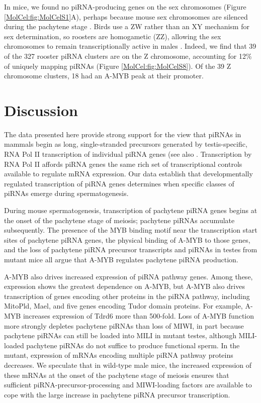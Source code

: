     In mice, we found no piRNA-producing genes on the sex chromosomes (Figure \ref{MolCel:fig:MolCelS1}A), perhaps because mouse sex chromosomes are silenced during the pachytene stage \citep{Li2009d}. Birds use a ZW rather than an XY mechanism for sex determination, so roosters are homogametic (ZZ), allowing the sex chromosomes to remain transcriptionally active in males \citep{Namekawa2009, Schoenmakers2009}. Indeed, we find that 39 of the 327 rooster piRNA clusters are on the Z chromosome, accounting for 12\% of uniquely mapping piRNAs (Figure \ref{MolCel:fig:MolCelS8}). Of the 39 Z chromosome clusters, 18 had an A-MYB peak at their promoter.

\section{Discussion}
  \label{MolCel:sec:Discussion}

  The data presented here provide strong support for the view that piRNAs in mammals begin as long, single-stranded precursors generated by testis-specific, RNA Pol II transcription of individual piRNA genes (see also \citet{Vourekas2012}. Transcription by RNA Pol II affords piRNA genes the same rich set of transcriptional controls available to regulate mRNA expression. Our data establish that developmentally regulated transcription of piRNA genes determines when specific classes of piRNAs emerge during spermatogenesis.

  During mouse spermatogenesis, transcription of pachytene piRNA genes begins at the onset of the pachytene stage of meiosis; pachytene piRNAs accumulate subsequently. The presence of the MYB binding motif near the transcription start sites of pachytene piRNA genes, the physical binding of A-MYB to those genes, and the loss of pachytene piRNA precursor transcripts and piRNAs in testes from \amyb{} mutant mice all argue that A-MYB regulates pachytene piRNA production.

  A-MYB also drives increased expression of piRNA pathway genes. Among these, \miwi{} expression shows the greatest dependence on A-MYB, but A-MYB also drives transcription of genes encoding other proteins in the piRNA pathway, including MitoPld, Mael, and five genes encoding Tudor domain proteins. For example, A-MYB increases expression of Tdrd6 more than 500-fold. Loss of A-MYB function more strongly depletes pachytene piRNAs than loss of MIWI, in part because pachytene piRNAs can still be loaded into MILI in \miwi{} mutant testes, although MILI-loaded pachytene piRNAs do not suffice to produce functional sperm. In the \amyb{} mutant, expression of mRNAs encoding multiple piRNA pathway proteins decreases. We speculate that in wild-type male mice, the increased expression of these mRNAs at the onset of the pachytene stage of meiosis ensures that sufficient piRNA-precursor-processing and MIWI-loading factors are available to cope with the large increase in pachytene piRNA precursor transcription.

